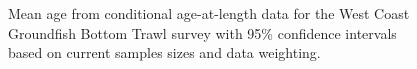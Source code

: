 \documentclass[
]{scrartcl}
\begin{document}
\begin{figure}[H]


\caption{\label{fig-wcgbts-mean-caal}Mean age from conditional
age-at-length data for the West Coast Groundfish Bottom Trawl survey
with 95\% confidence intervals based on current samples sizes and data
weighting.}

\end{figure}%
\end{document}
